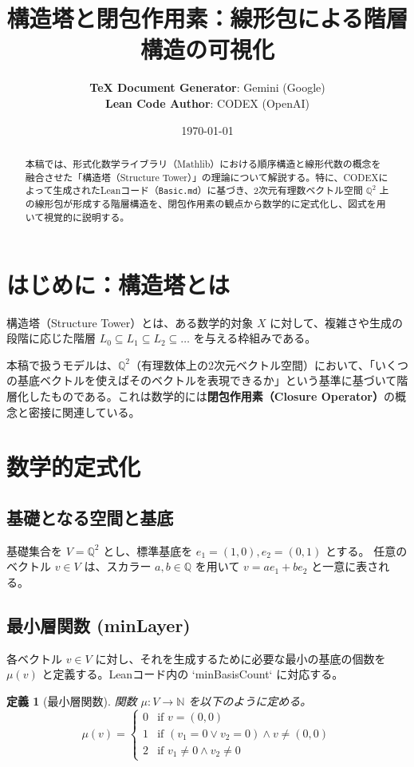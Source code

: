 \documentclass[11pt, a4paper]{article}
\title{構造塔と閉包作用素：線形包による階層構造の可視化}
\author{
    \textbf{TeX Document Generator}: Gemini (Google) \\
    \textbf{Lean Code Author}: CODEX (OpenAI)
}
\date{\today}
\newtheorem{definition}{定義}[section]
\begin{document}
\maketitle

\begin{abstract}
本稿では、形式化数学ライブラリ（Mathlib）における順序構造と線形代数の概念を融合させた「構造塔（Structure Tower）」の理論について解説する。特に、CODEXによって生成されたLeanコード（\texttt{Basic.md}）に基づき、2次元有理数ベクトル空間 $\mathbb{Q}^2$ 上の線形包が形成する階層構造を、閉包作用素の観点から数学的に定式化し、図式を用いて視覚的に説明する。
\end{abstract}

\section{はじめに：構造塔とは}

構造塔（Structure Tower）とは、ある数学的対象 $X$ に対して、複雑さや生成の段階に応じた階層 $L_0 \subseteq L_1 \subseteq L_2 \subseteq \dots$ を与える枠組みである。

本稿で扱うモデルは、$\mathbb{Q}^2$（有理数体上の2次元ベクトル空間）において、「いくつの基底ベクトルを使えばそのベクトルを表現できるか」という基準に基づいて階層化したものである。これは数学的には\textbf{閉包作用素（Closure Operator）}の概念と密接に関連している。

\section{数学的定式化}

\subsection{基礎となる空間と基底}

基礎集合を $V = \mathbb{Q}^2$ とし、標準基底を $e_1 = (1, 0), e_2 = (0, 1)$ とする。
任意のベクトル $v \in V$ は、スカラー $a, b \in \mathbb{Q}$ を用いて $v = ae_1 + be_2$ と一意に表される。

\subsection{最小層関数 (minLayer)}

各ベクトル $v \in V$ に対し、それを生成するために必要な最小の基底の個数を $\mu(v)$ と定義する。Leanコード内の `minBasisCount` に対応する。

\begin{definition}[最小層関数]
関数 $\mu: V \to \mathbb{N}$ を以下のように定める。
\[
\mu(v) = 
\begin{cases} 
0 & \text{if } v = (0, 0) \\
1 & \text{if } (v_1 = 0 \lor v_2 = 0) \land v \neq (0, 0) \\
2 & \text{if } v_1 \neq 0 \land v_2 \neq 0 
\end{cases}
\]
\end{definition}
\end{document}
